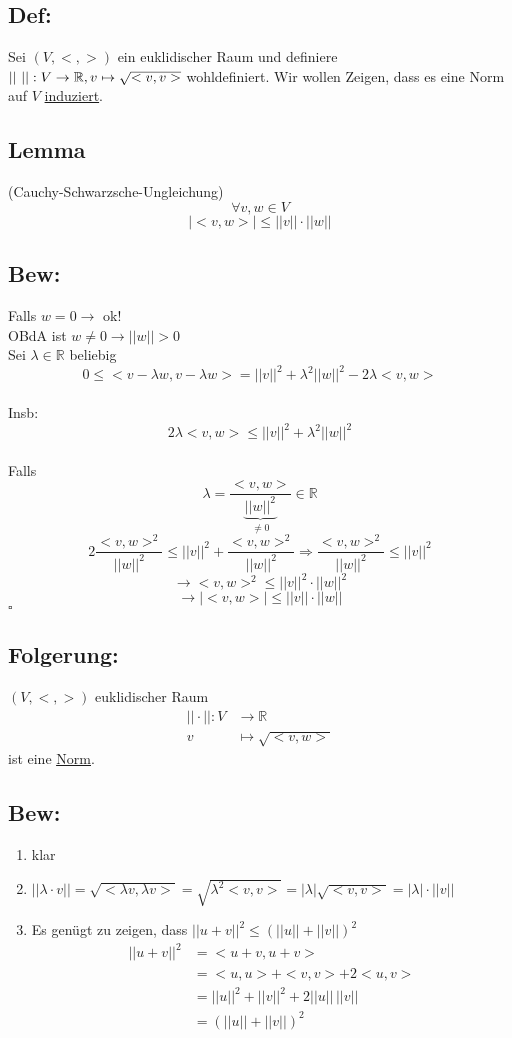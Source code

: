 \documentclass[titlepage,12pt,a4paper,ngerman]{report}
\newenvironment{bew}{\subsection{Bew:}}{\hfill$\square$}
\newcommand{\Bew}[1]{\begin{bew}#1\end{bew}}
\newcommand{\ub}[1]{\underbrace{#1}}
\begin{document}
\subsection{Def:}
Sei $(V,<,>)$ ein euklidischer Raum und definiere $||\ ||: V \to \mathbb R,\\v \mapsto \sqrt{<v,v>}$ wohldefiniert. Wir wollen Zeigen, dass es eine Norm auf $V$ \underline{induziert}.
\subsection{Lemma}
(Cauchy-Schwarzsche-Ungleichung)
$$\forall v, w \in V$$
$$|<v,w>| \leq ||v|| \cdot ||w||$$
\Bew{
	Falls $w=0 \rightarrow$ ok!\\
	OBdA ist $ w \neq 0 \rightarrow ||w||>0 $\\
	Sei $  \lambda \in \mathbb{R} $ beliebig \\
	$$ 0 \le < v- \lambda w , v - \lambda w > = ||v||^2+ \lambda^2 ||w||^2 - 2 \lambda <v,w> $$\\
	Insb:
	$$ 2 \lambda <v,w> \le ||v||^2 + \lambda^2 ||w||^2 $$\\
	Falls $$ \lambda = \frac{<v,w>}{\ub{||w||^2}_{\neq 0}} \in \mathbb{R} $$
	$$ 2 \frac{<v,w>^2}{||w||^2} \le ||v||^2 + \frac{<v,w>^2}{||w||^2} \Rightarrow \frac{<v,w>^2}{||w||^2} \le ||v||^2 $$
	$$ \rightarrow <v,w>^2 \le ||v||^2 \cdot ||w||^2$$
	$$ \rightarrow |<v,w>| \le ||v|| \cdot ||w|| $$
}
\subsection{Folgerung:}
$ (V,<,>) $ euklidischer Raum\\
\begin{align*}
||\cdot ||: V & \to \mathbb{R}\\
v & \mapsto \sqrt{<v,w>}
\end{align*}
ist eine \underline{\underline{Norm}}.
\subsection{Bew:}
\begin{enumerate}[1)]
	\item klar
	\item $ ||\lambda \cdot v || = \sqrt{< \lambda v,  \lambda v>} = \sqrt{\lambda^2 <v,v>} = |\lambda| \sqrt{<v,v>} = |\lambda| \cdot ||v|| $
	\item Es genügt zu zeigen, dass $ ||u+v||^2 \le (||u|| + ||v||)^2 $\\
	\begin{align*}
	||u+v||^2 & = < u+v, u+v>\\
	& = < u,u> + <v,v> + 2 <u,v>\\
	& = ||u||^2 + ||v||^2 + 2 ||u||\, ||v||\\
	& = (||u|| + ||v||)^2
	\end{align*}
\end{enumerate}
\end{document}
